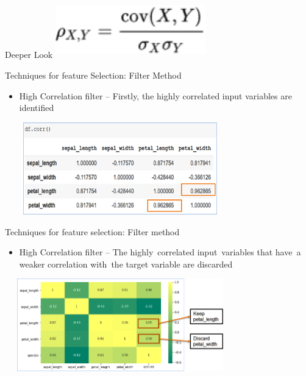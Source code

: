 \documentclass[aspectratio=169,14pt,usenames,dvipsnames]{beamer}
\begin{document}
\begin{frame}{Deeper Look}
\centering
\includegraphics[width=6.5cm , height=2.5cm]{Images/AIML_FD_IMG6.png}
\end{frame}

\begin{frame}{Techniques for feature Selection: Filter Method}
\begin{itemize}
\item High Correlation filter – Firstly, the highly correlated input variables are identified\\
\end{itemize}
\centering
\includegraphics[width=10cm , height=4cm]{Images/AIML_FD_IMG7.png}
\end{frame}


\begin{frame}{Techniques for feature selection: Filter method}
\begin{itemize}

\item High Correlation filter – The highly correlated input variables that have a weaker correlation with the target variable are discarded\\
\end{itemize}
\centering
\includegraphics[width=10cm , height=4cm]{Images/AIML_FD_IMG8.png}
\end{frame}
\end{document}
